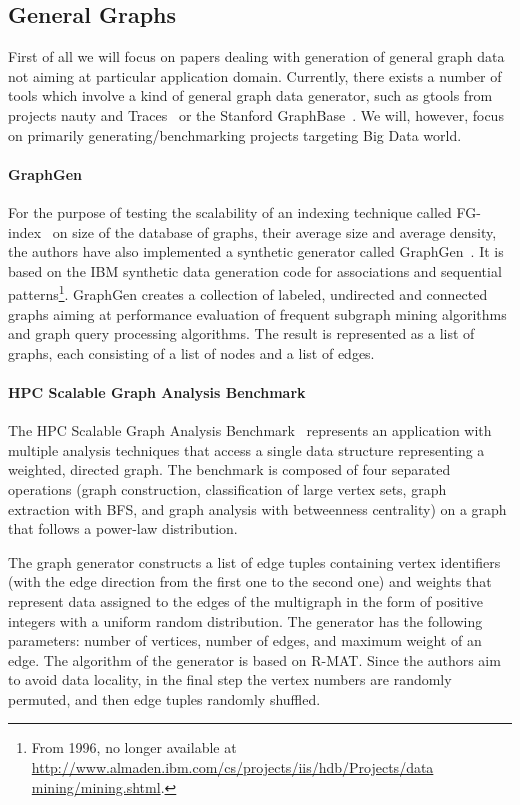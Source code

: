 \subsection{General Graphs}
\label{sec:generators_general}

First of all we will focus on papers dealing with generation of general graph
data not aiming at particular application domain. Currently, there exists a
number of tools which involve a kind of general graph data generator, such as
gtools from projects nauty and Traces~\cite{gtools} or the Stanford
GraphBase~\cite{GraphBase}. We will, however, focus on primarily
generating/benchmarking projects targeting Big Data world.



\paragraph{GraphGen} For the purpose of testing the scalability of an indexing
technique called FG-index~\cite{Cheng:2007:FTV:1247480.1247574} on size of the
database of graphs, their average size and average density, the authors have
also implemented a synthetic generator called GraphGen~\cite{GraphGen}. It is
based on the IBM synthetic data generation code for associations and sequential
patterns\footnote{From 1996, no longer available at
\url{http://www.almaden.ibm.com/cs/projects/iis/hdb/Projects/data
mining/mining.shtml}.}. GraphGen creates a collection of labeled, undirected and
connected graphs aiming at performance evaluation of frequent subgraph mining
algorithms and graph query processing algorithms. The result is represented as a
list of graphs, each consisting of a list of nodes and a list of edges.

\paragraph{HPC Scalable Graph Analysis Benchmark} The HPC Scalable Graph
Analysis Benchmark~\cite{HPCgraph,Bader:2005:DIH:2099301.2099360} represents an
application with multiple analysis techniques that access a single data
structure representing a weighted, directed graph. The benchmark is composed of
four separated operations (graph construction, classification of large vertex
sets, graph extraction with BFS, and graph analysis with betweenness centrality)
on a graph that follows a power-law distribution.

The graph generator constructs a list of edge tuples containing vertex
identifiers (with the edge direction from the first one to the second one) and
weights that represent data assigned to the edges of the multigraph in the form
of positive integers with a uniform random distribution. The generator has the
following parameters: number of vertices, number of edges, and maximum weight of
an edge. The algorithm of the generator is based on R-MAT. Since the authors aim
to avoid data locality, in the final step the vertex numbers are randomly
permuted, and then edge tuples randomly shuffled.


